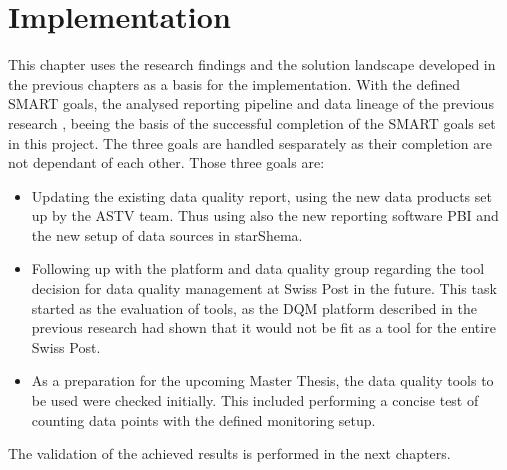 \chapter{Implementation}
This chapter uses the research findings and the solution landscape developed in the previous chapters as a basis for the implementation. With the defined SMART goals, the analysed reporting pipeline and data lineage of the previous research \cite{Roccaro2026_Project1}, beeing the basis of the successful completion of the SMART goals set in this project. The three goals are handled sesparately as their completion are not dependant of each other. Those three goals are:
\begin{itemize}
    \item Updating the existing data quality report, using the new data products set up by the ASTV team. Thus using also the new reporting software \gls{PBI} and the new setup of data sources in \gls{starShema}.

    \item Following up with the platform and data quality group regarding the tool decision for data quality management at Swiss Post in the future. This task started as the evaluation of tools, as the DQM platform described in the previous research \cite{Roccaro2026_Project1} had shown that it would not be fit as a tool for the entire Swiss Post.

    \item As a preparation for the upcoming Master Thesis, the data quality tools to be used were checked initially. This included performing a concise test of counting data points with the defined monitoring setup.
\end{itemize}


The validation of the achieved results is performed in the next chapters.




